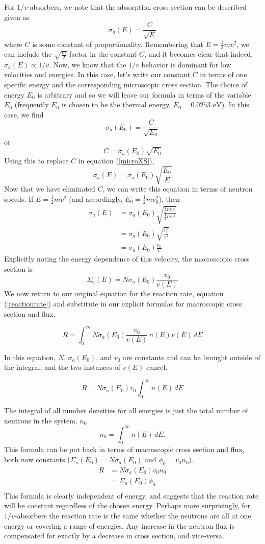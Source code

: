 \documentclass{report}
\begin{document}
For $1/v$-absorbers, we note that the absorption cross section can be described given as
\begin{equation}
\label{microXS}
\sigma_a(E) = \frac{C}{\sqrt{E}}
\end{equation}
where $C$ is some constant of proportionality. Remembering that $E = \frac{1}{2}mv^2$, we can include the $\sqrt{\frac{m}{2}}$ factor in the constant $C$, and it becomes clear that indeed, $\sigma_a(E) \propto 1/v$. Now, we know that the $1/v$ behavior is dominant for low velocities and energies. In this case, let's write our constant $C$ in terms of one specific energy and the corresponding microscopic cross section. The choice of energy $E_0$ is arbitrary and so we will leave our formula in terms of the variable $E_0$ (frequently $E_0$ is chosen to be the thermal energy, $E_0 = 0.0253\text{ eV}$). In this case, we find
$$ \sigma_a(E_0) = \frac{C}{\sqrt{E_0}} $$
or
$$ C = \sigma_a(E_0)\sqrt{E_0} $$
Using this to replace $C$ in equation (\ref{microXS}), 
$$ \sigma_a(E) = \sigma_a(E_0)\sqrt{\frac{E_0}{E}} $$
Now that we have eliminated $C$, we can write this equation in terms of neutron speeds. If $E = \frac{1}{2}mv^2$ (and accordingly, $E_0 = \frac{1}{2}mv_0^2$), then
\begin{align*}
\sigma_a(E)	&= \sigma_a(E_0)\sqrt{\frac{\frac{1}{2}mv_0^2}{\frac{1}{2}mv^2}} \\
			&= \sigma_a(E_0)\sqrt{\frac{v_0^2}{v^2}} \\
			&= \sigma_a(E_0)\frac{v_0}{v}
\end{align*}
Explicitly noting the energy dependence of this velocity, the macroscopic cross section is
$$ \Sigma_a(E) = N \sigma_a(E_0)\frac{v_0}{v(E)} $$
We now return to our original equation for the reaction rate, equation (\ref{reactionrate}) and substitute in our explicit formulas for macroscopic cross section and flux.

$$ R = \int_0^{\infty} N \sigma_a(E_0)\frac{v_0}{v(E)} \, n(E) v(E) \, dE $$

In this equation, $N$, $\sigma_a(E_0)$, and $v_0$ are constants and can be brought outside of the integral, and the two instances of $v(E)$ cancel.

$$ R = N \sigma_a(E_0) v_0 \int_0^{\infty} n(E) \, dE $$

The integral of all number densities for all energies is just the total number of neutrons in the system, $n_0$. 
$$ n_0 = \int_0^{\infty} n(E) \, dE .$$
This formula can be put back in terms of macroscopic cross section and flux, both now constants ($\Sigma_a(E_0) = N \sigma_a(E_0)$ and $\phi_0 = v_0 n_0$).
\begin{align*}
R	&= N \sigma_a(E_0) v_0 n_0 \\
	&= \Sigma_a(E_0) \phi_0 \\
\end{align*}
This formula is clearly independent of energy, and suggests that the reaction rate will be constant regardless of the chosen energy. Perhaps more surprisingly, for $1/v$-absorbers the reaction rate is the same whether the neutrons are all at one energy or covering a range of energies. Any increase in the neutron flux is compensated for exactly by a decrease in cross section, and vice-versa.



\end{document}
